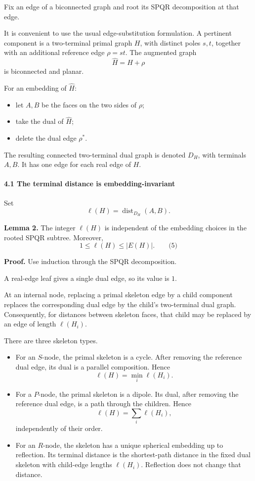 \documentclass[
  11pt,
  a4paper,
]{article}
\providecommand{\tightlist}{%
  \setlength{\itemsep}{0pt}\setlength{\parskip}{0pt}}
\begin{document}
Fix an edge of a biconnected graph and root its SPQR decomposition at
that edge.

It is convenient to use the usual edge-substitution formulation. A
pertinent component is a two-terminal primal graph \(H\), with distinct
poles \(s,t\), together with an additional reference edge \(\rho=st\).
The augmented graph \[
\widehat H=H+\rho
\] is biconnected and planar.

For an embedding of \(\widehat H\):

\begin{itemize}
\tightlist
\item
  let \(A,B\) be the faces on the two sides of \(\rho\);
\item
  take the dual of \(\widehat H\);
\item
  delete the dual edge \(\rho^*\).
\end{itemize}

The resulting connected two-terminal dual graph is denoted \(D_H\), with
terminals \(A,B\). It has one edge for each real edge of \(H\).

\paragraph{4.1 The terminal distance is
embedding-invariant}\label{the-terminal-distance-is-embedding-invariant}

Set \[
\ell(H)=\operatorname{dist}_{D_H}(A,B).
\]

\textbf{Lemma 2.} The integer \(\ell(H)\) is independent of the
embedding choices in the rooted SPQR subtree. Moreover, \[
1\le \ell(H)\le |E(H)|.
\qquad\text{(5)}
\]

\textbf{Proof.} Use induction through the SPQR decomposition.

A real-edge leaf gives a single dual edge, so its value is \(1\).

At an internal node, replacing a primal skeleton edge by a child
component replaces the corresponding dual edge by the child's
two-terminal dual graph. Consequently, for distances between skeleton
faces, that child may be replaced by an edge of length \(\ell(H_i)\).

There are three skeleton types.

\begin{itemize}
\tightlist
\item
  For an \(S\)-node, the primal skeleton is a cycle. After removing the
  reference dual edge, its dual is a parallel composition. Hence \[
  \ell(H)=\min_i\ell(H_i).
  \]
\item
  For a \(P\)-node, the primal skeleton is a dipole. Its dual, after
  removing the reference dual edge, is a path through the children.
  Hence \[
  \ell(H)=\sum_i\ell(H_i),
  \] independently of their order.
\item
  For an \(R\)-node, the skeleton has a unique spherical embedding up to
  reflection. Its terminal distance is the shortest-path distance in the
  fixed dual skeleton with child-edge lengths \(\ell(H_i)\). Reflection
  does not change that distance.
\end{itemize}
\end{document}
